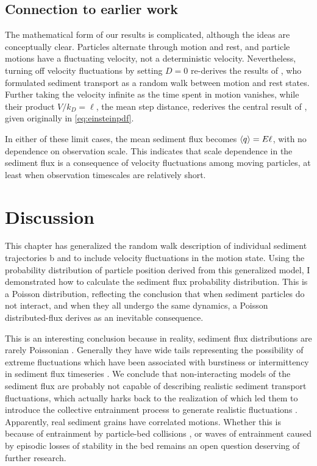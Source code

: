 \subsection{Connection to earlier work}

The mathematical form of our results is complicated, although the ideas are conceptually clear. Particles alternate through motion and rest, and particle motions have a fluctuating velocity, not a deterministic velocity. 
Nevertheless, turning off velocity fluctuations by setting $D=0$ re-derives the results of \citet{Lisle1998}, who formulated sediment transport as a random walk between motion and rest states.
Further taking the velocity infinite as the time spent in motion vanishes, while their product $V/k_D = \ell$, the mean step distance, rederives the central result of \citet{Einstein1937}, given originally in \ref{eq:einsteinpdf}.

In either of these limit cases, the mean sediment flux becomes $\langle q \rangle = E \ell$, with no dependence on observation scale. This indicates that scale dependence in the sediment flux is a consequence of velocity fluctuations among moving particles, at least when observation timescales are relatively short.
 
\section{Discussion \label{sec:disc}}

This chapter has generalized the random walk description of individual sediment trajectories b \citet{Lisle1998} and \citet{Lajeunesse2018} to include velocity fluctuations in the motion state.
Using the probability distribution of particle position derived from this generalized model, I demonstrated how to calculate the sediment flux probability distribution. 
This is a Poisson distribution, reflecting the conclusion that when sediment particles do not interact, and when they all undergo the same dynamics, a Poisson distributed-flux derives as an inevitable consequence. 

This is an interesting conclusion because in reality, sediment flux distributions are rarely Poissonian \citep{Ancey2008,Turowski2010,Dhont2010,Saletti2015}.
Generally they have wide tails representing the possibility of extreme fluctuations which have been associated with burstiness or intermittency in sediment flux timeseries \citep{Singh2009, Benavides2021}.
We conclude that non-interacting models of the sediment flux are probably not capable of describing realistic sediment transport fluctuations, which actually harks back to the realization of \citet{Ancey2006} which led them to introduce the collective entrainment process to generate realistic fluctuations \citep{Ancey2008}.
Apparently, real sediment grains have correlated motions. Whether this is because of entrainment by particle-bed collisions \citep{Lee2018,Heyman2016}, or waves of entrainment caused by episodic losses of stability in the bed \citep{Heyman2013,Dhont2018,Benavides2021} remains an open question deserving of further research.


